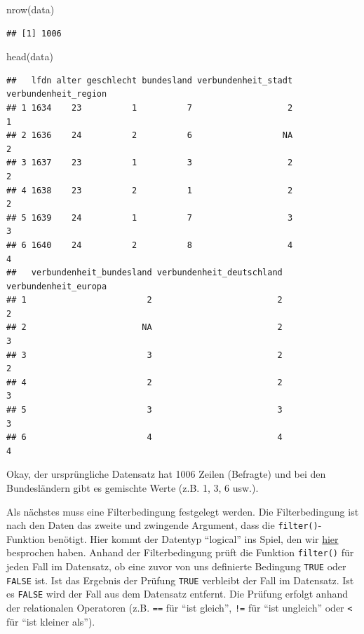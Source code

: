 \documentclass[
]{book}
\newenvironment{Shaded}{\begin{snugshade}}{\end{snugshade}}
\newcommand{\FunctionTok}[1]{\textcolor[rgb]{0.00,0.00,0.00}{#1}}
\newcommand{\NormalTok}[1]{#1}
\begin{document}
\begin{Shaded}
\begin{Highlighting}[]
\FunctionTok{nrow}\NormalTok{(data)}
\end{Highlighting}
\end{Shaded}

\begin{verbatim}
## [1] 1006
\end{verbatim}

\begin{Shaded}
\begin{Highlighting}[]
\FunctionTok{head}\NormalTok{(data)}
\end{Highlighting}
\end{Shaded}

\begin{verbatim}
##   lfdn alter geschlecht bundesland verbundenheit_stadt verbundenheit_region
## 1 1634    23          1          7                   2                    1
## 2 1636    24          2          6                  NA                    2
## 3 1637    23          1          3                   2                    2
## 4 1638    23          2          1                   2                    2
## 5 1639    24          1          7                   3                    3
## 6 1640    24          2          8                   4                    4
##   verbundenheit_bundesland verbundenheit_deutschland verbundenheit_europa
## 1                        2                         2                    2
## 2                       NA                         2                    3
## 3                        3                         2                    2
## 4                        2                         2                    3
## 5                        3                         3                    3
## 6                        4                         4                    4
\end{verbatim}

Okay, der ursprüngliche Datensatz hat 1006 Zeilen (Befragte) und bei den Bundesländern gibt es gemischte Werte (z.B. 1, 3, 6 usw.).

Als nächstes muss eine Filterbedingung festgelegt werden. Die Filterbedingung ist nach den Daten das zweite und zwingende Argument, dass die \texttt{filter()}-Funktion benötigt. Hier kommt der Datentyp ``logical'' ins Spiel, den wir \protect\hyperlink{atomic_vector_types}{hier} besprochen haben. Anhand der Filterbedingung prüft die Funktion \texttt{filter()} für jeden Fall im Datensatz, ob eine zuvor von uns definierte Bedingung \texttt{TRUE} oder \texttt{FALSE} ist. Ist das Ergebnis der Prüfung \texttt{TRUE} verbleibt der Fall im Datensatz. Ist es \texttt{FALSE} wird der Fall aus dem Datensatz entfernt. Die Prüfung erfolgt anhand der relationalen Operatoren (z.B. \texttt{==} für ``ist gleich'', \texttt{!=} für ``ist ungleich'' oder \texttt{\textless{}} für ``ist kleiner als'').
\end{document}

